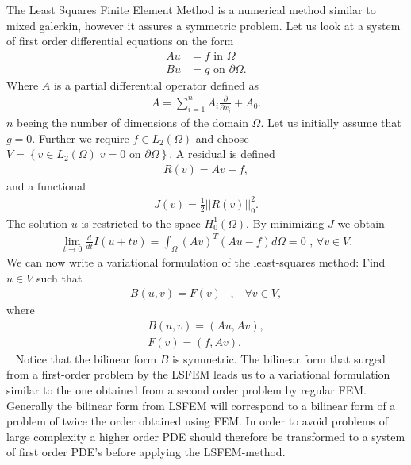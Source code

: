 The Least Squares Finite Element Method is a numerical method similar to mixed galerkin, however it assures a symmetric problem. Let us look at a system of first order differential equations on the form 
\begin{align}
	Au &= f \text{ in } \Omega \\
	Bu &= g \text{ on } \partial \Omega.
	\label{eq:PDE}
\end{align}
Where $A$ is a partial differential operator defined as 
\begin{align}
	A = \sum_{i = 1}^{n} A_i\frac{\partial}{\partial x_i} + A_0.
	\label{def:operatorA}
\end{align}
$n$ beeing the number of dimensions of the domain $\Omega$. Let us initially assume that $g=0$. Further we require $f \in L_2(\Omega)$ and choose $V = \left\{ v\in L_2(\Omega) | v = 0 \text{ on } \partial \Omega \right\}$. A residual is defined
\begin{align}
	R(v) = Av-f,
	\label{eq:Residual}
\end{align}
and a functional
\begin{align}
	 J(v) = \frac{1}{2}||R(v)||^2_0.
	\label{eq:Functional}
\end{align} 
The solution $u$ is restricted to the space $H^1_0(\Omega)$. By minimizing $J$ we obtain 
\begin{align}
	\lim_{t\rightarrow 0} \frac{d}{dt}I(u+tv) = \int_{\Omega}(Av)^T(Au-f)d\Omega = 0 \text{    ,   } \forall v \in V.
	\label{eq:minProb}
\end{align}
We can now write a variational formulation of the least-squares method: Find $u \in V$ such that 
\begin{align}
	B(u,v) = F(v) \; \; \; , \; \; \; \forall v \in V,
	\label{def:varForm}
\end{align}
where
\begin{align}
	B(u,v) = (Au,Av), \\
	F(v) = (f,Av).
	\label{def:bilin}
\end{align}
~\cite{Jiang}
Notice that the bilinear form $B$ is symmetric. The bilinear form that surged from a first-order problem by the LSFEM leads us to a variational formulation similar to the one obtained from a second order problem by regular FEM. Generally the bilinear form from LSFEM will correspond to a bilinear form of a problem of twice the order obtained using FEM. In order to avoid problems of large complexity a higher order PDE should therefore be transformed to a system of first order PDE's before applying the LSFEM-method. 

